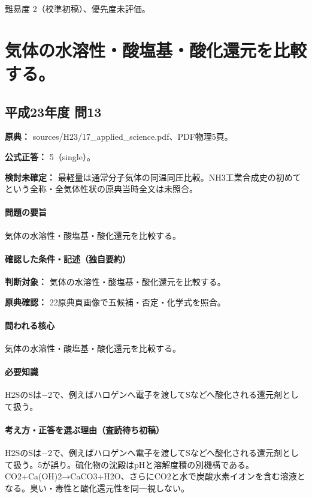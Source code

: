 \par 難易度 2（校準初稿）、優先度未評価。

\section{気体の水溶性・酸塩基・酸化還元を比較する。}

\subsection{平成23年度 問13}
\label{q:h23-reg-applied-13}

\noindent\textbf{原典：} sources/H23/17\_applied\_science.pdf、PDF物理5頁。

\textbf{公式正答：} 5（single）。

\par\textbf{検討未確定：} 最軽量は通常分子気体の同温同圧比較。NH3工業合成史の初めてという全称・全気体性状の原典当時全文は未照合。

\paragraph{問題の要旨} 気体の水溶性・酸塩基・酸化還元を比較する。

\paragraph{確認した条件・記述（独自要約）}\mbox{}\par

\noindent\textbf{判断対象：} 気体の水溶性・酸塩基・酸化還元を比較する。\par

\noindent\textbf{原典確認：} 22原典頁画像で五候補・否定・化学式を照合。\par

\paragraph{問われる核心} 気体の水溶性・酸塩基・酸化還元を比較する。

\paragraph{必要知識} H2SのSは−2で、例えばハロゲンへ電子を渡してSなどへ酸化される還元剤として扱う。

\paragraph{考え方・正答を選ぶ理由（査読待ち初稿）} H2SのSは−2で、例えばハロゲンへ電子を渡してSなどへ酸化される還元剤として扱う。5が誤り。硫化物の沈殿はpHと溶解度積の別機構である。CO2+Ca(OH)2→CaCO3+H2O、さらにCO2と水で炭酸水素イオンを含む溶液となる。臭い・毒性と酸化還元性を同一視しない。

